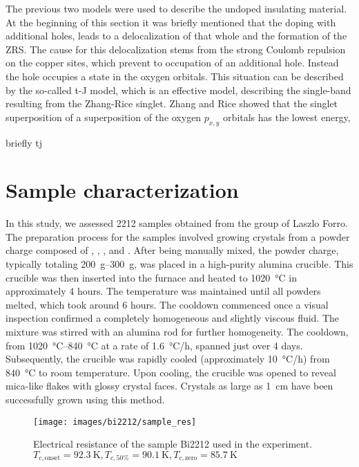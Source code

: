The previous two models were used to describe the undoped insulating material.
At the beginning of this section it was briefly mentioned that the doping with additional holes, leads to a delocalization of that whole and the formation of the ZRS.
The cause for this delocalization stems from the strong Coulomb repulsion on the copper sites, which prevent to occupation of an additional hole.
Instead the hole occupies a state in the oxygen orbitals.
This situation can be described by the so-called t-J model, which is an effective model, describing the single-band resulting from the Zhang-Rice singlet.
Zhang and Rice showed that the singlet superposition of a superposition of the oxygen $p_{x,y}$ orbitals has the lowest energy,

briefly tj

\section{Sample characterization}

In this study, we assessed 2212 samples obtained from the group of Laszlo Forro.
The preparation process for the samples involved growing crystals from a powder charge composed of , , , and .
After being manually mixed, the powder charge, typically totaling \qtyrange{200}{300}{\gram}, was placed in a high-purity alumina crucible.
This crucible was then inserted into the furnace and heated to \qty{1020}{\degreeCelsius} in approximately 4 hours.
The temperature was maintained until all powders melted, which took around 6 hours.
The cooldown commenced once a visual inspection confirmed a completely homogeneous and slightly viscous fluid.
The mixture was stirred with an alumina rod for further homogeneity.
The cooldown, from \qtyrange{1020}{840}{\degreeCelsius} at a rate of \qty{1.6}{\degreeCelsius/\hour}, spanned just over 4 days.
Subsequently, the crucible was rapidly cooled (approximately \qty{10}{\degreeCelsius/\hour}) from \qty{840}{\degreeCelsius} to room temperature.
Upon cooling, the crucible was opened to reveal mica-like flakes with glossy crystal faces. Crystals as large as \qty{1}{\centi\meter} have been successfully grown using this method.

\begin{figure}
	\centering
	\texttt{[image: images/bi2212/sample\_res]}
	\caption{Electrical resistance of the sample Bi2212 used in the experiment. $T_{c,\text{onset}}=\qty{92.3}{\kelvin}, T_{c,\text{50\%}}=\qty{90.1}{\kelvin}, T_{c,\text{zero}}=\qty{85.7}{\kelvin}$}
	\label{fig:sampleres}
\end{figure}


